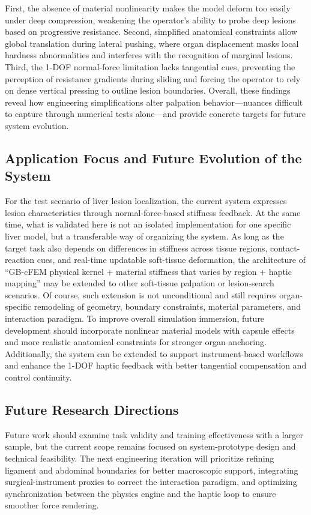 \documentclass{ieeeaccess}
\begin{document}
First, the absence of material nonlinearity makes the model deform too easily under deep compression, weakening the operator's ability to probe deep lesions based on progressive resistance. Second, simplified anatomical constraints allow global translation during lateral pushing, where organ displacement masks local hardness abnormalities and interferes with the recognition of marginal lesions. Third, the 1-DOF normal-force limitation lacks tangential cues, preventing the perception of resistance gradients during sliding and forcing the operator to rely on dense vertical pressing to outline lesion boundaries. Overall, these findings reveal how engineering simplifications alter palpation behavior—nuances difficult to capture through numerical tests alone—and provide concrete targets for future system evolution.

\subsection{Application Focus and Future Evolution of the System}
For the test scenario of liver lesion localization, the current system expresses lesion characteristics through normal-force-based stiffness feedback. At the same time, what is validated here is not an isolated implementation for one specific liver model, but a transferable way of organizing the system. As long as the target task also depends on differences in stiffness across tissue regions, contact-reaction cues, and real-time updatable soft-tissue deformation, the architecture of ``GB-cFEM physical kernel + material stiffness that varies by region + haptic mapping'' may be extended to other soft-tissue palpation or lesion-search scenarios. Of course, such extension is not unconditional and still requires organ-specific remodeling of geometry, boundary constraints, material parameters, and interaction paradigm. To improve overall simulation immersion, future development should incorporate nonlinear material models with capsule effects and more realistic anatomical constraints for stronger organ anchoring. Additionally, the system can be extended to support instrument-based workflows and enhance the 1-DOF haptic feedback with better tangential compensation and control continuity.

\subsection{Future Research Directions}
Future work should examine task validity and training effectiveness with a larger sample, but the current scope remains focused on system-prototype design and technical feasibility. The next engineering iteration will prioritize refining ligament and abdominal boundaries for better macroscopic support, integrating surgical-instrument proxies to correct the interaction paradigm, and optimizing synchronization between the physics engine and the haptic loop to ensure smoother force rendering.
\end{document}
